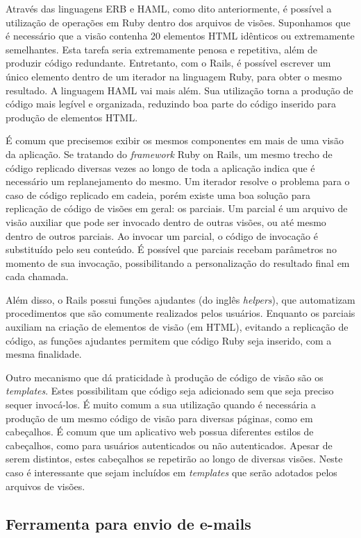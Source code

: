 Através das linguagens ERB e HAML, como dito anteriormente, é possível a utilização de operações em Ruby dentro dos arquivos de visões. Suponhamos que é necessário que a visão contenha 20 elementos HTML idênticos ou extremamente semelhantes. Esta tarefa seria extremamente penosa e repetitiva, além de produzir código redundante. Entretanto, com o Rails, é possível escrever um único elemento dentro de um iterador na linguagem Ruby, para obter o mesmo resultado. A linguagem HAML vai mais além. Sua utilização torna a produção de código mais legível e organizada, reduzindo boa parte do código inserido para produção de elementos HTML.

É comum que precisemos exibir os mesmos componentes em mais de uma visão da aplicação. Se tratando do \textit{framework} Ruby on Rails, um mesmo trecho de código replicado diversas vezes ao longo de toda a aplicação indica que é necessário um replanejamento do mesmo. Um iterador resolve o problema para o caso de código replicado em cadeia, porém existe uma boa solução para replicação de código de visões em geral: os parciais. Um parcial é um arquivo de visão auxiliar que pode ser invocado dentro de outras visões, ou até mesmo dentro de outros parciais. Ao invocar um parcial, o código de invocação é substituído pelo seu conteúdo. É possível que parciais recebam parâmetros no momento de sua invocação, possibilitando a personalização do resultado final em cada chamada.

Além disso, o Rails possui funções ajudantes (do inglês \textit{helpers}), que automatizam procedimentos que são comumente realizados pelos usuários. Enquanto os parciais auxiliam na criação de elementos de visão (em HTML), evitando a replicação de código, as funções ajudantes permitem que código Ruby seja inserido, com a mesma finalidade.

Outro mecanismo que dá praticidade à produção de código de visão são os \textit{templates}. Estes possibilitam que código seja adicionado sem que seja preciso sequer invocá-los. É muito comum a sua utilização quando é necessária a produção de um mesmo código de visão para diversas páginas, como em cabeçalhos. É comum que um aplicativo web possua diferentes estilos de cabeçalhos, como para usuários autenticados ou não autenticados. Apesar de serem distintos, estes cabeçalhos se repetirão ao longo de diversas visões. Neste caso é interessante que sejam incluídos em \textit{templates} que serão adotados pelos arquivos de visões.

\subsection{Ferramenta para envio de e-mails}

